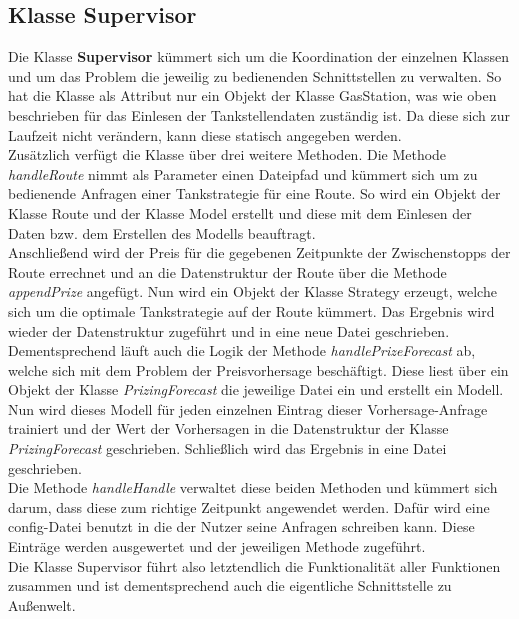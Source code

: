 \documentclass[11pt]{article}
\begin{document}
\subsection{Klasse Supervisor}
	Die Klasse \textbf{Supervisor} kümmert sich um die Koordination der einzelnen Klassen und um das Problem die jeweilig zu bedienenden Schnittstellen zu verwalten. So hat die Klasse als Attribut nur ein Objekt der Klasse GasStation, was  wie oben beschrieben für das Einlesen der Tankstellendaten zuständig ist. Da diese sich zur Laufzeit nicht verändern, kann diese statisch angegeben werden. \\
	Zusätzlich verfügt die Klasse über drei weitere Methoden. Die Methode \textit{handleRoute} nimmt als Parameter einen Dateipfad und kümmert sich um zu bedienende Anfragen einer Tankstrategie für eine Route. So wird ein Objekt der Klasse Route und der Klasse Model erstellt und diese mit dem Einlesen der Daten bzw. dem Erstellen des Modells beauftragt. \\
	Anschließend wird der Preis für die gegebenen Zeitpunkte der Zwischenstopps der Route errechnet und an die Datenstruktur der Route über die Methode \textit{appendPrize} angefügt. Nun wird ein Objekt der Klasse Strategy erzeugt, welche sich um die optimale Tankstrategie auf der Route kümmert. Das Ergebnis wird wieder der Datenstruktur zugeführt und in eine neue Datei geschrieben.\\
	Dementsprechend läuft auch die Logik der Methode \textit{handlePrizeForecast} ab, welche sich mit dem Problem der Preisvorhersage beschäftigt. Diese liest über ein Objekt der Klasse \textit{PrizingForecast} die jeweilige Datei ein und erstellt ein Modell. Nun wird dieses Modell für jeden einzelnen Eintrag dieser Vorhersage-Anfrage trainiert und der Wert der Vorhersagen in die Datenstruktur der Klasse \textit{PrizingForecast} geschrieben. Schließlich wird das Ergebnis in eine Datei geschrieben. \\
	Die Methode \textit{handleHandle} verwaltet diese beiden Methoden und kümmert sich darum, dass diese zum richtige Zeitpunkt angewendet werden. Dafür wird eine config-Datei benutzt in die der Nutzer seine Anfragen schreiben kann. Diese Einträge werden ausgewertet und der jeweiligen Methode zugeführt. \\
	Die Klasse Supervisor führt also letztendlich die Funktionalität aller Funktionen zusammen und ist dementsprechend auch die eigentliche Schnittstelle zu Außenwelt.
\end{document}
